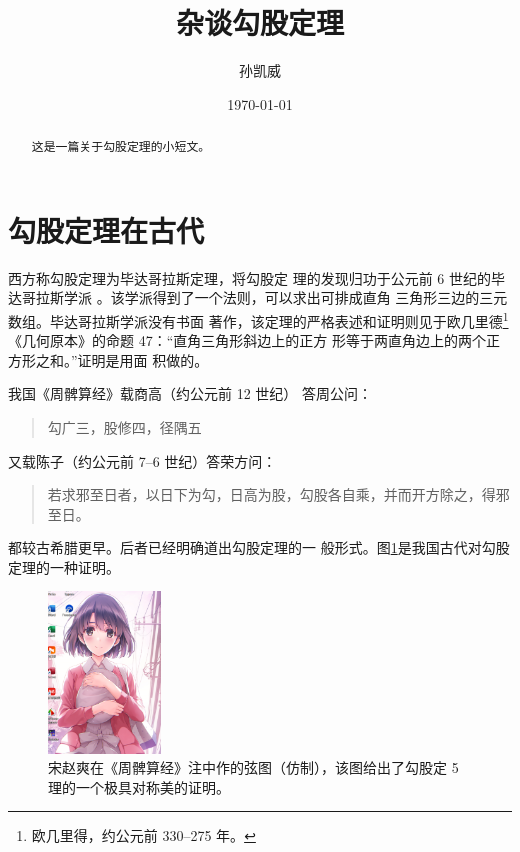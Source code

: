 \documentclass[UTF8]{ctexart}
\title{\heiti 杂谈勾股定理}
\author{\kaishu 孙凯威}
\date{\today}
\newenvironment{myquote}{\begin{quote}\kaishu\zihao{-5}}
{\end{quote}}
\begin{document}
    \maketitle
    \begin{abstract}
        这是一篇关于勾股定理的小短文。
    \end{abstract}
    \tableofcontents

    \section{勾股定理在古代}
    西方称勾股定理为毕达哥拉斯定理，将勾股定
理的发现归功于公元前 6 世纪的毕达哥拉斯学派
\cite{Kline}。该学派得到了一个法则，可以求出可排成直角
三角形三边的三元数组。毕达哥拉斯学派没有书面
	著作，该定理的严格表述和证明则见于欧几里德\footnote{欧几里得，约公元前 330--275 年。}
《几何原本》的命题 47：“直角三角形斜边上的正方
形等于两直角边上的两个正方形之和。”证明是用面
积做的。

我国《周髀算经》载商高（约公元前 12 世纪）
答周公问：
    \begin{myquote}
	    勾广三，股修四，径隅五
    \end{myquote}
又载陈子（约公元前 7--6 世纪）答荣方问：
\begin{myquote}
	若求邪至日者，以日下为勾，日高为股，勾股各自乘，并而开方除之，得邪至日。
\end{myquote}
都较古希腊更早。后者已经明确道出勾股定理的一
般形式。图\ref{fig:xiantu}是我国古代对勾股定理的一种证明\cite{quanjing}。
\begin{figure}[ht]
    \centering
    \includegraphics[width=3cm]{xiantu.png}
    \caption{宋赵爽在《周髀算经》注中作的弦图（仿制），该图给出了勾股定
    5 理的一个极具对称美的证明。 }
    \label{fig:xiantu}
\end{figure}
\end{document}
